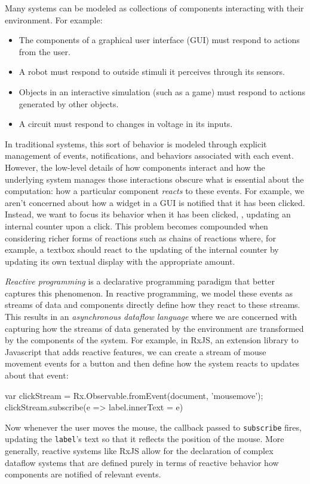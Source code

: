 Many systems can be modeled as collections of components interacting with their environment.
For example:
\begin{itemize}[itemsep=0pt]
  \item The components of a graphical user interface (GUI) must respond to actions from the user.
  \item A robot must respond to outside stimuli it perceives through its sensors.
  \item Objects in an interactive simulation (such as a game) must respond to actions generated by other objects.
  \item A circuit must respond to changes in voltage in its inputs.
\end{itemize}
In traditional systems, this sort of behavior is modeled through explicit management of events, notifications, and behaviors associated with each event.
However, the low-level details of how components interact and how the underlying system manages those interactions obscure what is essential about the computation: how a particular component \emph{reacts} to these events.
For example, we aren't concerned about how a widget in a GUI is notified that it has been clicked.
Instead, we want to focus its behavior when it has been clicked, \eg, updating an internal counter upon a click.
This problem becomes compounded when considering richer forms of reactions such as chains of reactions where, for example, a textbox should react to the updating of the internal counter by updating its own textual display with the appropriate amount.

\emph{Reactive programming} is a declarative programming paradigm that better captures this phenomenon.
In reactive programming, we model these events as streams of data and components directly define how they react to these streams.
This results in an \emph{asynchronous dataflow language} where we are concerned with capturing how the streams of data generated by the environment are transformed by the components of the system.
For example, in RxJS, an extension library to Javascript that adds reactive features, we can create a stream of mouse movement events for a button and then define how the system reacts to updates about that event:
\begin{javascriptcode}
var clickStream = Rx.Observable.fromEvent(document, 'mousemove');
clickStream.subscribe(e => label.innerText = e)
\end{javascriptcode}
Now whenever the user moves the mouse, the callback passed to \verb+subscribe+ fires, updating the \verb+label+'s text so that it reflects the position of the mouse.
More generally, reactive systems like RxJS allow for the declaration of complex dataflow systems that are defined purely in terms of reactive behavior how components are notified of relevant events.

